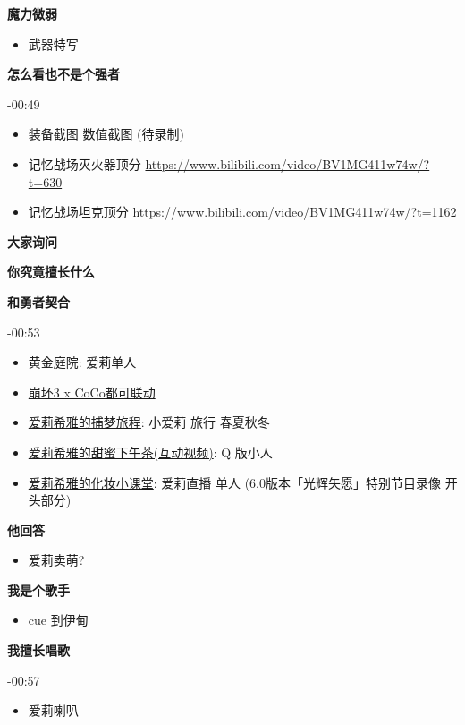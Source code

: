 \documentclass[a4paper]{article}
\begin{document}
\textbf{魔力微弱}

\begin{itemize}
    \item 武器特写
\end{itemize}

\textbf{怎么看也不是个强者}

-00:49

\begin{itemize}
    \item 装备截图 数值截图 (待录制)
    \item 记忆战场灭火器顶分 \url{https://www.bilibili.com/video/BV1MG411w74w/?t=630}
    \item 记忆战场坦克顶分 \url{https://www.bilibili.com/video/BV1MG411w74w/?t=1162}
\end{itemize}

\textbf{大家询问}

\textbf{你究竟擅长什么}

\textbf{和勇者契合}

-00:53

\begin{itemize}
    \item 黄金庭院: 爱莉单人
    \item \href{https://www.bilibili.com/video/BV1j84y1D7uf/}{崩坏3 x CoCo都可联动}
    \item \href{https://www.bilibili.com/video/BV1ZW4y1t7Zf/}{爱莉希雅的捕梦旅程}: 小爱莉 旅行 春夏秋冬
    \item \href{https://www.bilibili.com/video/BV1Ta411Z7KE/}{爱莉希雅的甜蜜下午茶(互动视频)}: Q 版小人
    \item \href{https://www.bilibili.com/video/BV12T411w7CN/}{爱莉希雅的化妆小课堂}: 爱莉直播 单人 (6.0版本「光辉矢愿」特别节目录像 开头部分)
\end{itemize}

\textbf{他回答}

\begin{itemize}
    \item 爱莉卖萌?
\end{itemize}

\textbf{我是个歌手}

\begin{itemize}
    \item cue 到伊甸
\end{itemize}

\textbf{我擅长唱歌}

-00:57

\begin{itemize}
    \item 爱莉喇叭
\end{itemize}
\end{document}
